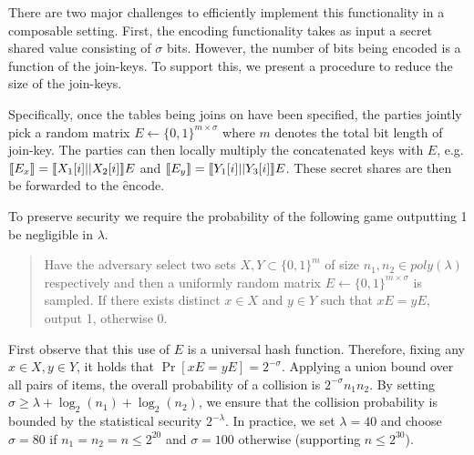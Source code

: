 There are two major challenges to efficiently implement this functionality in a composable setting. First, the encoding functionality takes as input a secret shared value consisting of $\sigma$ bits. However, the number of bits being encoded is a function of the join-keys. To support this, we present a procedure to reduce the size of the join-keys. 

Specifically, once the tables being joins on have been specified, the parties jointly pick a random matrix $E\gets\{0,1\}^{m\times \sigma}$ where $m$ denotes the total bit length of join-key. The parties can then locally multiply the concatenated keys with $E$, e.g. $\llbracket E_x\rrbracket=\llbracket X_1[i] || X_2[i]\rrbracket E$ and $\llbracket E_y\rrbracket=\llbracket Y_1[i] || Y_3[i]\rrbracket E$. These secret shares are then be forwarded to the \f{encode}.

To preserve security we require the probability of the following game outputting 1 be negligible in $\lambda$. 
\begin{quote}
Have the adversary select two sets $X,Y\subset \{0,1\}^{m}$ of size $n_1,n_2\in poly(\lambda)$  respectively and then a uniformly random matrix $E\gets \{0,1\}^{m\times \sigma}$ is sampled. If there exists distinct $x\in X$ and $y\in Y$ such that $xE = yE$, output 1, otherwise 0. 
\end{quote}

First observe that this use of $E$ is a universal hash function. Therefore, fixing any $x\in X, y\in Y$, it holds that $\Pr[xE=yE]=2^{-\sigma}$. Applying a union bound over all pairs of items, the overall probability of a collision is $2^{-\sigma}n_1n_2$. By setting $\sigma \geq \lambda + \log_2(n_1) + \log_2(n_2)$, we ensure that the collision probability is bounded by the statistical  security $2^{-\lambda}$.
\iffullversion
 In practice, we set $\lambda=40$ and choose $\sigma =80$ if $n_1=n_2=n\leq 2^{20}$ and $\sigma=100$ otherwise (supporting $n\leq 2^{30}$). 
\fi


